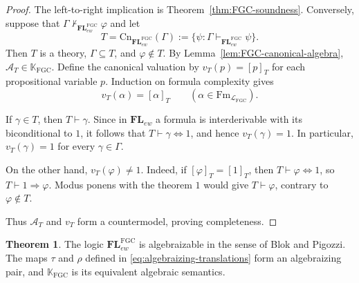 \documentclass[final,12pt,times]{elsarticle}
\theoremstyle{plain}
\theoremstyle{definition}
\newtheorem{theorem}[definition]{Theorem}
\theoremstyle{break}
\begin{document}
\begin{proof}
The left-to-right implication is Theorem~\ref{thm:FGC-soundness}.  Conversely,
suppose that
$\Gamma\nvdash_{\mathbf{FL}^{\mathrm{FGC}}_{ew}}\varphi$ and let
\[
 T=\mathrm{Cn}_{\mathbf{FL}^{\mathrm{FGC}}_{ew}}(\Gamma)
   :=\{\psi:\Gamma\vdash_{\mathbf{FL}^{\mathrm{FGC}}_{ew}}\psi\}.
\]
Then $T$ is a theory, $\Gamma\subseteq T$, and $\varphi\notin T$.  By
Lemma~\ref{lem:FGC-canonical-algebra},
$\mathscr{A}_T\in\mathbb K_{\mathrm{FGC}}$.  Define the canonical valuation by
$v_T(p)=[p]_T$ for each propositional variable $p$.  Induction on formula
complexity gives
\[
 v_T(\alpha)=[\alpha]_T
 \qquad
 (\alpha\in\mathrm{Fm}_{\mathcal L_{\mathrm{FGC}}}).
\]

If $\gamma\in T$, then $T\vdash\gamma$.  Since in $\mathbf{FL}_{ew}$ a
formula is interderivable with its biconditional to $1$, it follows that
$T\vdash\gamma\Leftrightarrow1$, and hence $v_T(\gamma)=1$.  In particular,
$v_T(\gamma)=1$ for every $\gamma\in\Gamma$.

On the other hand, $v_T(\varphi)\ne1$.  Indeed, if
$[\varphi]_T=[1]_T$, then
$T\vdash\varphi\Leftrightarrow1$, so
$T\vdash1\Rightarrow\varphi$.  Modus ponens with the theorem $1$ would give
$T\vdash\varphi$, contrary to $\varphi\notin T$.  

Thus $\mathscr{A}_T$ and
$v_T$ form a countermodel, proving completeness.
\end{proof}

\begin{theorem}\label{thm:FGC-algebraizability}
The logic $\mathbf{FL}^{\mathrm{FGC}}_{ew}$ is algebraizable in the sense of
Blok and Pigozzi.  The maps $\tau$ and $\rho$ defined in
\eqref{eq:algebraizing-translations} form an algebraizing pair, and
$\mathbb K_{\mathrm{FGC}}$ is its equivalent algebraic semantics.
\end{theorem}
\end{document}

